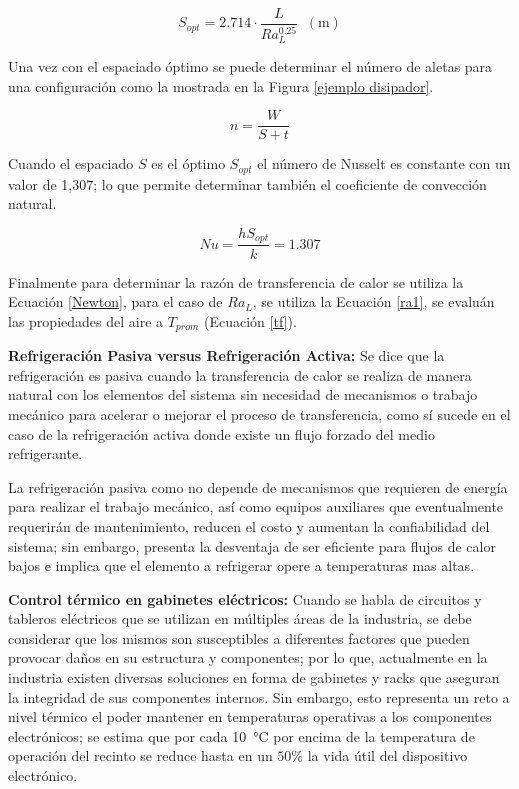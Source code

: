 \begin{equation}\label{sopt}
    S_{opt}=2.714\cdot \frac{L}{Ra_{L}^{0.25}}\;\;(\si{\meter})
\end{equation}

Una vez con el espaciado óptimo se puede determinar el número de aletas para una configuración como la mostrada en la Figura \ref{ejemplo disipador}.

\begin{equation}\label{numeroaletas}
    n=\frac{W}{S+t}
\end{equation}

Cuando el espaciado $S$ es el  óptimo $S_{opt}$ el número de Nusselt es constante con un valor de 1,307; lo que permite determinar también el coeficiente de convección natural. 

\begin{equation}\label{hdisipador}
    Nu=\frac{hS_{opt}}{k}=1.307
\end{equation}

Finalmente para determinar la razón de transferencia de calor se utiliza la Ecuación \ref{Newton}, para el caso de $Ra_{L}$, se utiliza la Ecuación \ref{ra1}, se evaluán las propiedades del aire a $T_{prom}$ (Ecuación \ref{tf}).

\textbf{Refrigeración Pasiva versus Refrigeración Activa:} Se dice que la refrigeración es pasiva cuando la transferencia de calor se realiza de manera natural con los elementos del sistema sin necesidad de mecanismos o trabajo mecánico para acelerar o mejorar el proceso de transferencia, como sí sucede en el caso de la refrigeración activa donde existe un flujo forzado del medio refrigerante. \cite{cengel}

La refrigeración pasiva como no depende de mecanismos que requieren de energía para realizar el trabajo mecánico, así como equipos auxiliares que eventualmente requerirán de mantenimiento, reducen el costo y aumentan la confiabilidad del sistema; sin embargo, presenta la desventaja de ser eficiente para flujos de calor bajos e implica que el elemento a refrigerar opere a temperaturas mas altas. \cite{motor}

\textbf{Control térmico en gabinetes eléctricos:} Cuando se habla de circuitos y tableros eléctricos que se utilizan en múltiples áreas de la industria, se debe considerar que los mismos son susceptibles a diferentes factores que pueden provocar daños en su estructura y componentes; por lo que, actualmente en la industria existen diversas soluciones en forma de gabinetes y racks que aseguran la integridad de sus componentes internos\cite{factores}. Sin embargo, esto representa un reto a nivel térmico el poder mantener en temperaturas operativas a los componentes electrónicos; se estima que por cada \SI{10}{\celsius} por encima de la temperatura de operación del recinto se reduce hasta en un $50\%$ la vida útil del dispositivo electrónico. \cite{hoffman}


